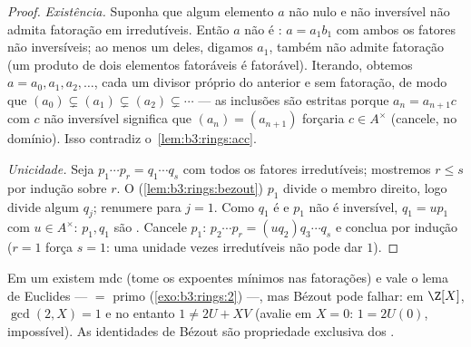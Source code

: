 \begin{proof}
\emph{Existência.} Suponha que algum elemento $a$ não nulo e não
inversível não admita fatoração em irredutíveis. Então $a$ não é
: $a =
a_1b_1$ com ambos os fatores não inversíveis; ao menos um
deles, digamos $a_1$, também não admite fatoração (um produto de
dois elementos fatoráveis é fatorável). Iterando, obtemos $a = a_0, a_1, a_2,
\dots$, cada
um divisor próprio do anterior e sem fatoração, de modo que $(a_0) \subsetneq (a_1) \subsetneq (a_2) \subsetneq \cdots$ ---
as inclusões são estritas porque $a_n = a_{n+1}c$ com $c$ não inversível
significa que $(a_n) = (a_{n+1})$ forçaria $c \in A^\times$ (cancele, no domínio). Isso
contradiz o~\cref{lem:b3:rings:acc}.

\emph{Unicidade.} Seja $p_1 \cdots p_r = q_1 \cdots q_s$ com todos os fatores irredutíveis;
mostremos $r \leq s$ por indução sobre $r$. O 
(\cref{lem:b3:rings:bezout}) $p_1$ divide o membro direito, logo divide algum
$q_j$; renumere para $j = 1$. Como $q_1$ é  e
$p_1$ não é inversível, $q_1 = u p_1$ com $u \in A^\times$: $p_1,
q_1$ são .
Cancele $p_1$: $p_2 \cdots p_r = (u q_2)
q_3\cdots q_s$ e conclua por indução ($r = 1$ força
$s = 1$: uma unidade vezes irredutíveis não pode dar $1$).
\end{proof}

\begin{remark}\label{rem:b3:rings:ufdgcd}
Em um  existem mdc (tome os expoentes mínimos nas fatorações) e vale
o lema de Euclides ---  $=$ primo (\cref{exo:b3:rings:2}) ---,
mas Bézout pode falhar: em $\Z[X]$, $\gcd(2, X) = 1$ e no entanto $1 \neq 2U + XV$
(avalie em $X = 0$: $1 = 2U(0)$, impossível). As identidades de Bézout
são propriedade exclusiva dos .
\end{remark}

